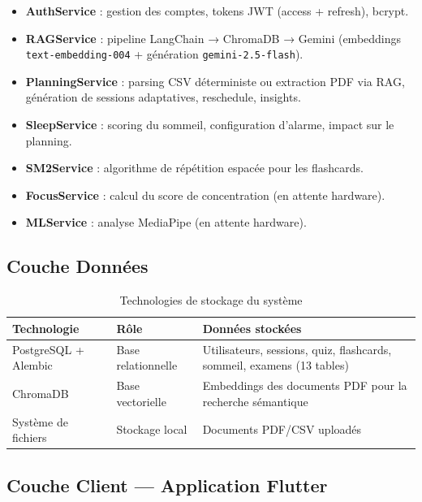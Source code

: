 \documentclass[12pt,a4paper]{report}
\begin{document}
\begin{itemize}
    \item \textbf{AuthService} : gestion des comptes, tokens JWT (access + refresh), bcrypt.
    \item \textbf{RAGService} : pipeline LangChain → ChromaDB → Gemini (embeddings \texttt{text-embedding-004} + génération \texttt{gemini-2.5-flash}).
    \item \textbf{PlanningService} : parsing CSV déterministe ou extraction PDF via RAG, génération de sessions adaptatives, reschedule, insights.
    \item \textbf{SleepService} : scoring du sommeil, configuration d'alarme, impact sur le planning.
    \item \textbf{SM2Service} : algorithme de répétition espacée pour les flashcards.
    \item \textbf{FocusService} : calcul du score de concentration (en attente hardware).
    \item \textbf{MLService} : analyse MediaPipe (en attente hardware).
\end{itemize}

\subsection{Couche Données}

\begin{table}[H]
    \centering
    \caption{Technologies de stockage du système}
    \label{tab:stockage}
    \renewcommand{\arraystretch}{1.3}
    \begin{tabular}{|l|l|p{6.5cm}|}
        \hline
        \textbf{Technologie} & \textbf{Rôle} & \textbf{Données stockées} \\
        \hline
        PostgreSQL + Alembic & Base relationnelle & Utilisateurs, sessions, quiz, flashcards, sommeil, examens (13 tables) \\
        \hline
        ChromaDB & Base vectorielle & Embeddings des documents PDF pour la recherche sémantique \\
        \hline
        Système de fichiers & Stockage local & Documents PDF/CSV uploadés \\
        \hline
    \end{tabular}
\end{table}

\subsection{Couche Client — Application Flutter}
\end{document}
